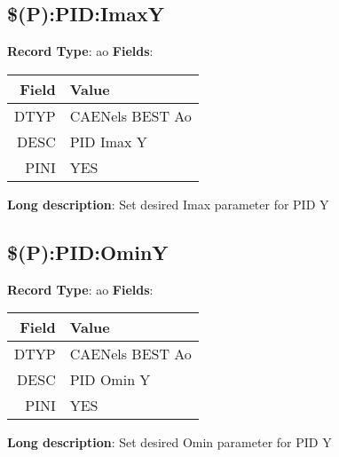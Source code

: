 \subsection{\$(P):PID:ImaxY}
\textbf{Record Type}: ao \newline \newline 
\textbf{Fields}: \newline 
\begin{tabularx}{0.7\linewidth}{|r|X|}
\hline Field & Value \\
\hline
\hline
DTYP & CAENels BEST Ao\\
\hline
DESC & PID Imax Y\\
\hline
PINI & YES\\
\hline
\end{tabularx}
\newline \newline \newline
\textbf{Long description}: \newline 
 Set desired Imax parameter for PID Y
\newline \newline

\subsection{\$(P):PID:OminY}
\textbf{Record Type}: ao \newline \newline 
\textbf{Fields}: \newline 
\begin{tabularx}{0.7\linewidth}{|r|X|}
\hline Field & Value \\
\hline
\hline
DTYP & CAENels BEST Ao\\
\hline
DESC & PID Omin Y\\
\hline
PINI & YES\\
\hline
\end{tabularx}
\newline \newline \newline
\textbf{Long description}: \newline 
 Set desired Omin parameter for PID Y
\newline \newline

